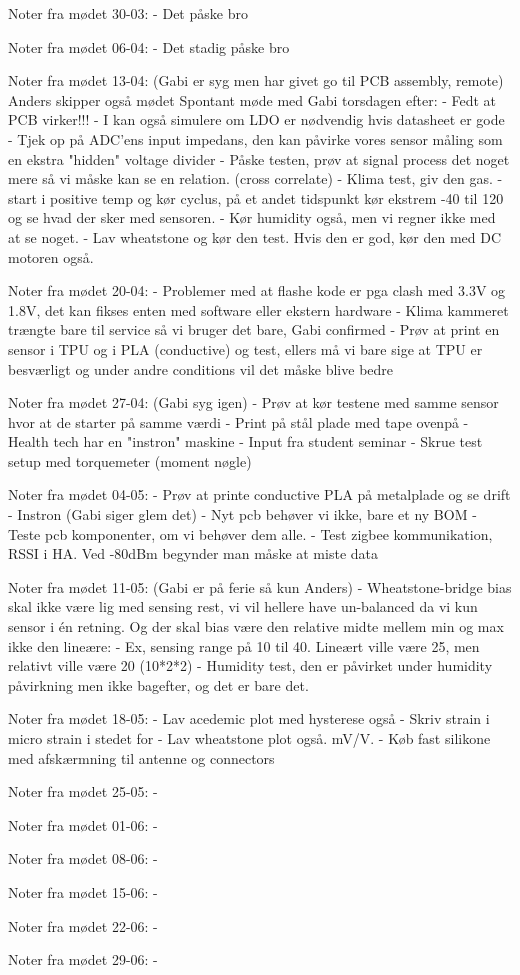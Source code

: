 Noter fra mødet 30-03:
- Det påske bro

Noter fra mødet 06-04:
- Det stadig påske bro

Noter fra mødet 13-04:
(Gabi er syg men har givet go til PCB assembly, remote)
Anders skipper også mødet
Spontant møde med Gabi torsdagen efter:
- Fedt at PCB virker!!!
    - I kan også simulere om LDO er nødvendig hvis datasheet er gode
    - Tjek op på ADC'ens input impedans, den kan påvirke vores sensor måling som en ekstra          "hidden" voltage divider
- Påske testen, prøv at signal process det noget mere så vi måske kan se en relation. (cross        correlate)
- Klima test, giv den gas.
    - start i positive temp og kør cyclus, på et andet tidspunkt kør ekstrem -40 til 120 og se      hvad der sker med sensoren. 
    - Kør humidity også, men vi regner ikke med at se noget.
    - Lav wheatstone og kør den test. Hvis den er god, kør den med DC motoren også.

Noter fra mødet 20-04:
- Problemer med at flashe kode er pga clash med 3.3V og 1.8V, det kan fikses enten med software     eller ekstern hardware
- Klima kammeret trængte bare til service så vi bruger det bare, Gabi confirmed
- Prøv at print en sensor i TPU og i PLA (conductive) og test, ellers må vi bare sige at TPU er     besværligt og under andre conditions vil det måske blive bedre

Noter fra mødet 27-04:
(Gabi syg igen)
- Prøv at kør testene med samme sensor hvor at de starter på samme værdi
- Print på stål plade med tape ovenpå
- Health tech har en "instron" maskine
- Input fra student seminar
    - Skrue test setup med torquemeter (moment nøgle)

Noter fra mødet 04-05:
- Prøv at printe conductive PLA på metalplade og se drift
- Instron (Gabi siger glem det)
- Nyt pcb behøver vi ikke, bare et ny BOM
- Teste pcb komponenter, om vi behøver dem alle.
- Test zigbee kommunikation, RSSI i HA. Ved -80dBm begynder man måske at miste data

Noter fra mødet 11-05:
(Gabi er på ferie så kun Anders)
- Wheatstone-bridge bias skal ikke være lig med sensing rest, vi vil hellere have un-balanced da vi kun sensor i én retning. Og der skal bias være den relative midte mellem min og max ikke den lineære:
    - Ex, sensing range på 10 til 40. Lineært ville være 25, men relativt ville være 20 (10*2*2)
- Humidity test, den er påvirket under humidity påvirkning men ikke bagefter, og det er bare det.

Noter fra mødet 18-05:
- Lav acedemic plot med hysterese også
- Skriv strain i micro strain i stedet for
- Lav wheatstone plot også. mV/V.
- Køb fast silikone med afskærmning til antenne og connectors

Noter fra mødet 25-05:
- 

Noter fra mødet 01-06:
- 

Noter fra mødet 08-06:
- 

Noter fra mødet 15-06:
- 

Noter fra mødet 22-06:
- 

Noter fra mødet 29-06:
- 